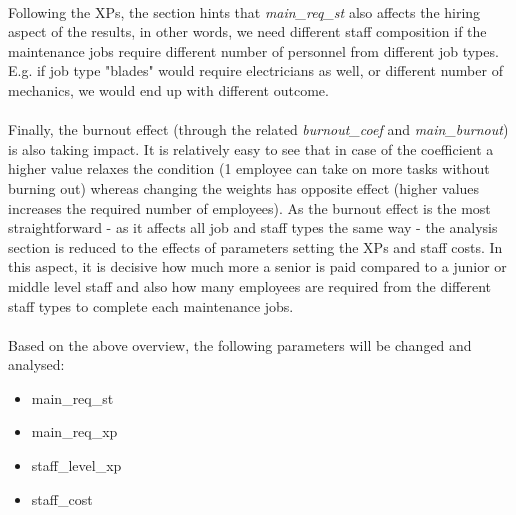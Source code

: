     \paragraph{} Following the XPs, the  section hints that 
    \textit{main\_req\_st} also affects the hiring aspect of the results, in other words, we need 
    different staff composition if the maintenance jobs require different number of personnel from 
    different job types. E.g. if job type "blades" would require electricians as well, or different 
    number of mechanics, we would end up with different outcome.

    \paragraph{} Finally, the burnout effect (through the related \textit{burnout\_coef} and 
    \textit{main\_burnout}) is also taking impact. It is relatively easy to see that in case 
    of the coefficient a higher value relaxes the condition (1 employee can take on more tasks
    without burning out) whereas changing the weights has opposite effect (higher values increases
    the required number of employees). As the burnout effect is the most straightforward - as it 
    affects all job and staff types the same way - the analysis section is reduced to the effects 
    of parameters setting the XPs and staff costs. In this aspect, it is decisive how much more a 
    senior is paid compared to a junior or middle level staff and also how many employees are 
    required from the different staff types to complete each maintenance jobs.

    \paragraph{} Based on the above overview, the following parameters will be changed and analysed:
    \begin{itemize}
        \item main\_req\_st
        \item main\_req\_xp
        \item staff\_level\_xp
        \item staff\_cost
    \end{itemize}

